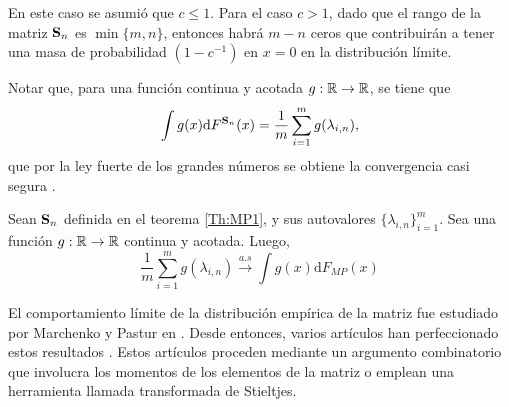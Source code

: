 En este caso se asumió que $c\le 1$. Para el caso $c>1$, dado que el rango de la matriz $\mathbf{S}_n$ es $\min\{m,n\}$, entonces habrá $m-n$ ceros que contribuirán a tener una masa de probabilidad $(1-c^{-1})$ en $x=0$ en la distribución límite.

Notar que, para una función continua y acotada $g:\mathbb{R}\to\mathbb{R}$, se tiene que
\[\int g(x)\mathrm{d}F^{\mathbf{S}_n}(x) = \frac{1}{m}\sum_{i=1}^mg(\lambda_{i,n}),\]
que por la ley fuerte de los grandes números se obtiene la convergencia casi segura \cite{dudley2002}.
\begin{prop}\label{prop:SLLN}
    Sean $\mathbf{S}_n$ definida en el teorema \eqref{Th:MP1}, y sus autovalores  $\{\lambda_{i,n}\}_{i=1}^m$. Sea una función $g:\mathbb{R}\to\mathbb{R}$ continua y acotada. Luego,
    \begin{equation}
        \frac{1}{m}\sum_{i=1}^m g(\lambda_{i,n})\xrightarrow[]{a.s} \int g(x)\mathrm{d}F_{MP}(x)
        \label{Eq:SLLN}
    \end{equation}
\end{prop}


El comportamiento límite de la distribución empírica de la matriz fue estudiado por Marchenko y Pastur en \cite{Marchenko1967}. Desde entonces, varios artículos han perfeccionado estos resultados \cite{Bai2010}. Estos artículos proceden mediante un argumento combinatorio que involucra los momentos de los elementos de la matriz o emplean una herramienta llamada transformada de Stieltjes.



